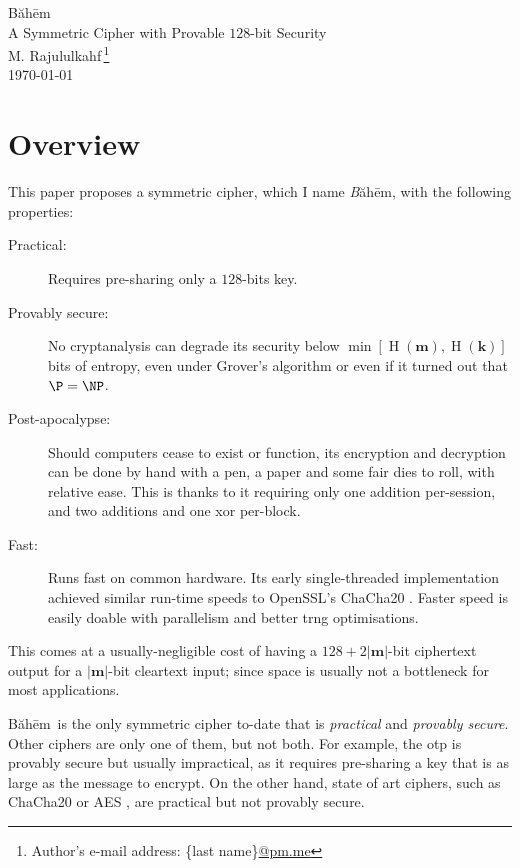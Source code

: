\documentclass[twocolumn,hidelinks]{article}
\newcommand{\baheem}{Băhēm}
\DeclareMathOperator{\entropy}{H}
\begin{document}
\begin{center}
    \Huge
    \baheem\\
    \LARGE
    A Symmetric Cipher with Provable $128$-bit Security\\
    \normalsize
    \vspace{0.5em}
    M. Rajululkahf\,\footnote{Author's e-mail address: \{last
    name\}\url{@pm.me}}\\
    \vspace{0.5em}
    \footnotesize
    \today
\end{center}

\section*{Overview}
This paper proposes a symmetric cipher, which I name \emph\baheem, with the
following properties:
\begin{description}
    \item[Practical:]  Requires pre-sharing only a $128$-bits key.

    \item[Provably secure:]  No cryptanalysis can degrade its security
        below $\min[\entropy(\mathbf{m}), \entropy(\mathbf{k})]$ bits of
        entropy, even under Grover's algorithm \cite{10.1145/237814.237866}
        or even if it turned out that $\P = \NP$.

    \item[Post-apocalypse:]   Should computers cease to exist or function,
        its encryption and decryption can be done by hand with a pen, a
        paper and some fair dies to roll, with relative ease.  This is
        thanks to it requiring only one addition per-session, and two
        additions and one \gls{xor} per-block.

    \item[Fast:]  Runs fast on common hardware.  Its early single-threaded
        implementation achieved similar run-time speeds to OpenSSL's
        ChaCha20 \cite{chacha20}. Faster speed is easily doable with
        parallelism and better \gls{trng} optimisations.
\end{description}

This comes at a usually-negligible cost of having a $128 +
2|\mathbf{m}|$-bit ciphertext output for a $|\mathbf{m}|$-bit cleartext
input; since space is usually not a bottleneck for most applications. 

\baheem\ is the only symmetric cipher to-date that is \emph{practical} and
\emph{provably secure}.  Other ciphers are only one of them, but not both.
For example, the \gls{otp} is provably secure but usually impractical, as
it requires pre-sharing a key that is as large as the message to encrypt.
On the other hand, state of art ciphers, such as ChaCha20 \cite{chacha20}
or AES \cite{aes}, are practical but not provably secure.
\end{document}
